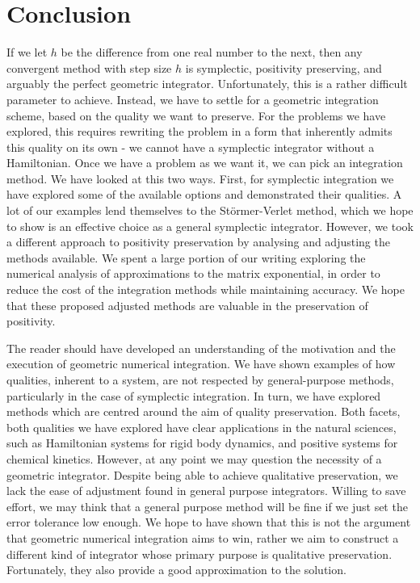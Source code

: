 \section{Conclusion}


If we let $h$ be the difference from one real number to the next, then any convergent method with step size $h$ is symplectic, positivity preserving, and arguably the perfect geometric integrator.
Unfortunately, this is a rather difficult parameter to achieve.
Instead, we have to settle for a geometric integration scheme, based on the quality we want to preserve.
For the problems we have explored, this requires rewriting the problem in a form that inherently admits this quality on its own - we cannot have a symplectic integrator without a Hamiltonian.
Once we have a problem as we want it, we can pick an integration method.
We have looked at this two ways.
First, for symplectic integration we have explored some of the available options and demonstrated their qualities.
A lot of our examples lend themselves to the St\"ormer-Verlet method, which we hope to show is an effective choice as a general symplectic integrator.
However, we took a different approach to positivity preservation by analysing and adjusting the methods available.
We spent a large portion of our writing exploring the numerical analysis of approximations to the matrix exponential,
in order to reduce the cost of the integration methods while maintaining accuracy.
We hope that these proposed adjusted methods are valuable in the preservation of positivity.

The reader should have developed an understanding of the motivation and the execution of geometric numerical integration.
We have shown examples of how qualities, inherent to a system, are not respected by general-purpose methods, particularly in the case of symplectic integration.
In turn, we have explored methods which are centred around the aim of quality preservation.
Both facets, both qualities we have explored have clear applications in the natural sciences, such as Hamiltonian systems for rigid body dynamics, and positive systems for chemical kinetics.
However, at any point we may question the necessity of a geometric integrator.
Despite being able to achieve qualitative preservation, we lack the ease of adjustment found in general purpose integrators.
Willing to save effort, we may think that a general purpose method will be fine if we just set the error tolerance low enough.
We hope to have shown that this is not the argument that geometric numerical integration aims to win,
rather we aim to construct a different kind of integrator whose primary purpose is qualitative preservation.
Fortunately, they also provide a good approximation to the solution.

